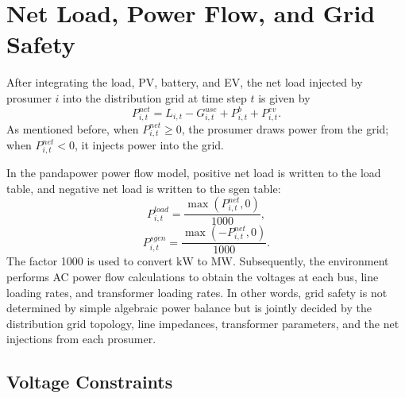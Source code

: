 \section{Net Load, Power Flow, and Grid Safety}

After integrating the load, PV, battery, and EV, the net load injected by prosumer \(i\) into the distribution grid at time step \(t\) is given by
\[
  P^{net}_{i,t}
  =
  L_{i,t}
  -
  G^{use}_{i,t}
  +
  P^b_{i,t}
  +
  P^{ev}_{i,t}.
\]
As mentioned before, when \(P^{net}_{i,t}\ge 0\), the prosumer draws power from the grid; when \(P^{net}_{i,t}<0\), it injects power into the grid.

In the pandapower power flow model, positive net load is written to the load table, and negative net load is written to the sgen table:
\[
  P^{load}_{i,t}=\frac{\max(P^{net}_{i,t},0)}{1000},
\]
\[
  P^{sgen}_{i,t}=\frac{\max(-P^{net}_{i,t},0)}{1000}.
\]
The factor 1000 is used to convert \(\mathrm{kW}\) to \(\mathrm{MW}\). Subsequently, the environment performs AC power flow calculations to obtain the voltages at each bus, line loading rates, and transformer loading rates. In other words, grid safety is not determined by simple algebraic power balance but is jointly decided by the distribution grid topology, line impedances, transformer parameters, and the net injections from each prosumer.

\subsection{Voltage Constraints}

